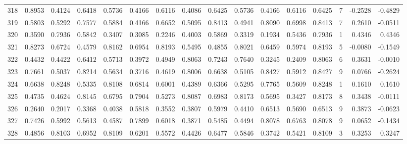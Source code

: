\begin{tabular}{lrrrrrrrrrrrrrrr}
318 &      0.8953 &  0.4124 &  0.6418 &  0.5736 &  0.4166 &  0.6116 &  0.4086 &  0.6425 &  0.5736 &  0.4166 &   0.6116 &     0.6425 &      7 &                   -0.2528 &                    -0.4829 \\
319 &      0.5803 &  0.5292 &  0.7577 &  0.5884 &  0.4166 &  0.6652 &  0.5095 &  0.8413 &  0.4941 &  0.8090 &   0.6998 &     0.8413 &      7 &                    0.2610 &                    -0.0511 \\
320 &      0.3590 &  0.7936 &  0.5842 &  0.3407 &  0.3085 &  0.2246 &  0.4003 &  0.5869 &  0.3319 &  0.1934 &   0.5436 &     0.7936 &      1 &                    0.4346 &                     0.4346 \\
321 &      0.8273 &  0.6724 &  0.4579 &  0.8162 &  0.6954 &  0.8193 &  0.5495 &  0.4855 &  0.8021 &  0.6459 &   0.5974 &     0.8193 &      5 &                   -0.0080 &                    -0.1549 \\
322 &      0.4432 &  0.4422 &  0.6412 &  0.5713 &  0.3972 &  0.4949 &  0.8063 &  0.7243 &  0.7640 &  0.3245 &   0.2409 &     0.8063 &      6 &                    0.3631 &                    -0.0010 \\
323 &      0.7661 &  0.5037 &  0.8214 &  0.5634 &  0.3716 &  0.4619 &  0.8006 &  0.6638 &  0.5105 &  0.8427 &   0.5912 &     0.8427 &      9 &                    0.0766 &                    -0.2624 \\
324 &      0.6638 &  0.8248 &  0.5335 &  0.8108 &  0.6814 &  0.6001 &  0.4389 &  0.6366 &  0.5295 &  0.7765 &   0.5609 &     0.8248 &      1 &                    0.1610 &                     0.1610 \\
325 &      0.4735 &  0.4624 &  0.8145 &  0.6795 &  0.7904 &  0.5273 &  0.8087 &  0.6983 &  0.8173 &  0.5695 &   0.3427 &     0.8173 &      8 &                    0.3438 &                    -0.0111 \\
326 &      0.2640 &  0.2017 &  0.3368 &  0.4038 &  0.5818 &  0.3552 &  0.3807 &  0.5979 &  0.4410 &  0.6513 &   0.5690 &     0.6513 &      9 &                    0.3873 &                    -0.0623 \\
327 &      0.7426 &  0.5992 &  0.5613 &  0.4587 &  0.7899 &  0.6018 &  0.3871 &  0.5485 &  0.4494 &  0.8078 &   0.6763 &     0.8078 &      9 &                    0.0652 &                    -0.1434 \\
328 &      0.4856 &  0.8103 &  0.6952 &  0.8109 &  0.6201 &  0.5572 &  0.4426 &  0.6477 &  0.5846 &  0.3742 &   0.5421 &     0.8109 &      3 &                    0.3253 &                     0.3247 \\

\end{tabular}
